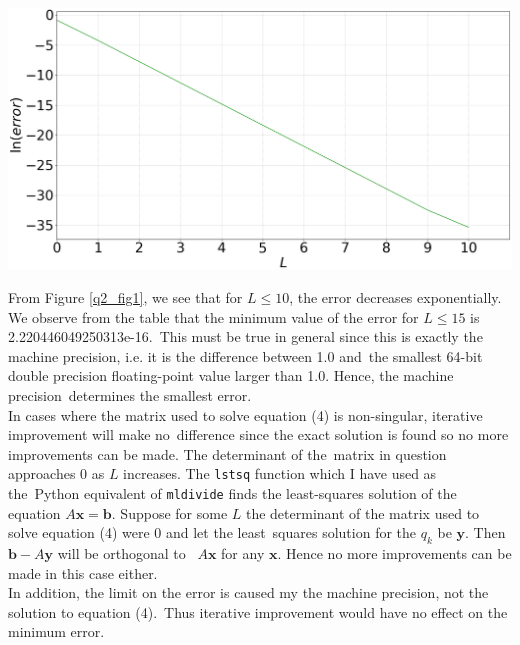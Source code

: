 \documentclass[12pt, a4paper]{article}
\begin{document}
\begin{minipage}{\textwidth}
	\includegraphics[width=\linewidth]{q2_fig1}
	\label{q2_fig1}
\end{minipage}
\vspace{0.3cm}

From Figure \ref{q2_fig1}, we see that for $L \leq 10$, the error decreases exponentially.
We observe from the table that the minimum value of the error for $L \leq 15$ is 2.220446049250313e-16.\ 
This must be true in general since this is exactly the machine precision, i.e. it is the  difference between 1.0 and\ 
the smallest 64-bit double precision floating-point value larger than 1.0. Hence, the machine precision\ 
determines the smallest error.
\\

In cases where the matrix used to solve equation (4) is non-singular, iterative improvement will make no\ 
difference since the exact solution is found so no more improvements can be made. The determinant of the\
matrix in question approaches 0 as $L$ increases. The \texttt{lstsq} function which I have used as the\ 
Python equivalent of \texttt{mldivide} finds the least-squares solution of the equation $A\mathbf{x} = \mathbf{b}$. 
Suppose for some $L$ the determinant of the matrix used to solve equation (4) were 0 and let the least\ 
squares solution for the $q_{k}$ be $\mathbf{y}$. Then $\mathbf{b}-A\mathbf{y}$ will be orthogonal to \ 
$A\mathbf{x}$ for any $\mathbf{x}$. Hence no more improvements can be made in this case either.
\\

In addition, the limit on the error is caused my the machine precision, not the solution to equation (4).\ 
Thus iterative improvement would have no effect on the minimum error.
\\
\end{document}
